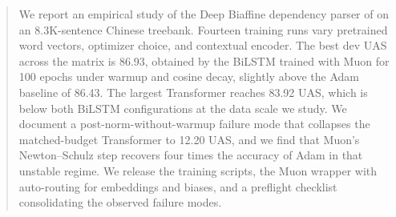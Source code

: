 \begin{abstract}
We report an empirical study of the Deep Biaffine dependency parser of \citet{dozat2017biaffine} on an 8.3K-sentence Chinese treebank. Fourteen training runs vary pretrained word vectors, optimizer choice, and contextual encoder. The best dev UAS across the matrix is 86.93, obtained by the BiLSTM trained with Muon for 100 epochs under warmup and cosine decay, slightly above the Adam baseline of 86.43. The largest Transformer reaches 83.92 UAS, which is below both BiLSTM configurations at the data scale we study. We document a post-norm-without-warmup failure mode that collapses the matched-budget Transformer to 12.20 UAS, and we find that Muon's Newton--Schulz step recovers four times the accuracy of Adam in that unstable regime. We release the training scripts, the Muon wrapper with auto-routing for embeddings and biases, and a preflight checklist consolidating the observed failure modes.
\end{abstract}
